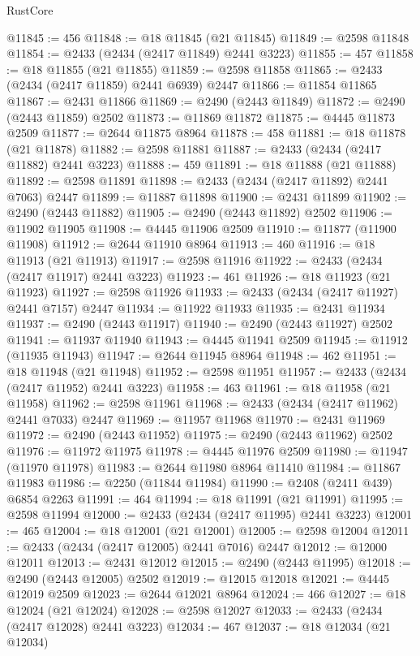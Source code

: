 \begin{lexlean}{RustCore}
\begin{coremodule}
@11845 := 456
@11848 := @18 @11845 (@21 @11845)
@11849 := @2598 @11848
@11854 := @2433 (@2434 (@2417 @11849) @2441 @3223)
@11855 := 457
@11858 := @18 @11855 (@21 @11855)
@11859 := @2598 @11858
@11865 := @2433 (@2434 (@2417 @11859) @2441 @6939) @2447
@11866 := @11854 @11865
@11867 := @2431 @11866
@11869 := @2490 (@2443 @11849)
@11872 := @2490 (@2443 @11859) @2502
@11873 := @11869 @11872
@11875 := @4445 @11873 @2509
@11877 := @2644 @11875 @8964
@11878 := 458
@11881 := @18 @11878 (@21 @11878)
@11882 := @2598 @11881
@11887 := @2433 (@2434 (@2417 @11882) @2441 @3223)
@11888 := 459
@11891 := @18 @11888 (@21 @11888)
@11892 := @2598 @11891
@11898 := @2433 (@2434 (@2417 @11892) @2441 @7063) @2447
@11899 := @11887 @11898
@11900 := @2431 @11899
@11902 := @2490 (@2443 @11882)
@11905 := @2490 (@2443 @11892) @2502
@11906 := @11902 @11905
@11908 := @4445 @11906 @2509
@11910 := @11877 (@11900 @11908)
@11912 := @2644 @11910 @8964
@11913 := 460
@11916 := @18 @11913 (@21 @11913)
@11917 := @2598 @11916
@11922 := @2433 (@2434 (@2417 @11917) @2441 @3223)
@11923 := 461
@11926 := @18 @11923 (@21 @11923)
@11927 := @2598 @11926
@11933 := @2433 (@2434 (@2417 @11927) @2441 @7157) @2447
@11934 := @11922 @11933
@11935 := @2431 @11934
@11937 := @2490 (@2443 @11917)
@11940 := @2490 (@2443 @11927) @2502
@11941 := @11937 @11940
@11943 := @4445 @11941 @2509
@11945 := @11912 (@11935 @11943)
@11947 := @2644 @11945 @8964
@11948 := 462
@11951 := @18 @11948 (@21 @11948)
@11952 := @2598 @11951
@11957 := @2433 (@2434 (@2417 @11952) @2441 @3223)
@11958 := 463
@11961 := @18 @11958 (@21 @11958)
@11962 := @2598 @11961
@11968 := @2433 (@2434 (@2417 @11962) @2441 @7033) @2447
@11969 := @11957 @11968
@11970 := @2431 @11969
@11972 := @2490 (@2443 @11952)
@11975 := @2490 (@2443 @11962) @2502
@11976 := @11972 @11975
@11978 := @4445 @11976 @2509
@11980 := @11947 (@11970 @11978)
@11983 := @2644 @11980 @8964 @11410
@11984 := @11867 @11983
@11986 := @2250 (@11844 @11984)
@11990 := @2408 (@2411 @439) @6854 @2263
@11991 := 464
@11994 := @18 @11991 (@21 @11991)
@11995 := @2598 @11994
@12000 := @2433 (@2434 (@2417 @11995) @2441 @3223)
@12001 := 465
@12004 := @18 @12001 (@21 @12001)
@12005 := @2598 @12004
@12011 := @2433 (@2434 (@2417 @12005) @2441 @7016) @2447
@12012 := @12000 @12011
@12013 := @2431 @12012
@12015 := @2490 (@2443 @11995)
@12018 := @2490 (@2443 @12005) @2502
@12019 := @12015 @12018
@12021 := @4445 @12019 @2509
@12023 := @2644 @12021 @8964
@12024 := 466
@12027 := @18 @12024 (@21 @12024)
@12028 := @2598 @12027
@12033 := @2433 (@2434 (@2417 @12028) @2441 @3223)
@12034 := 467
@12037 := @18 @12034 (@21 @12034)

\end{coremodule}
\end{lexlean}
